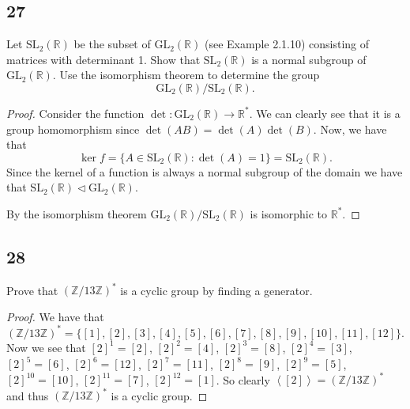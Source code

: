 \documentclass{article}
\newcommand{\Z}{\mathbb{Z}}
\newcommand{\R}{\mathbb{R}}
\newcommand{\gen}[1]{\left\langle #1 \right\rangle}
\newenvironment{hwproof}[1]
{
    #1
    \begin{proof}
}{
    \end{proof}
}
\begin{document}
\subsection*{27}
\begin{hwproof}
    {
        Let $\text{SL}_2(\R)$ be the subset of $\text{GL}_2(\R)$ (see Example 2.1.10)
        consisting of matrices with determinant 1. Show that $\text{SL}_2(\R)$ is a
        normal subgroup of $\text{GL}_2(\R)$. Use the isomorphism theorem to determine
        the group
        \begin{equation*}
            \text{GL}_2(\R) / \text{SL}_2(\R).
        \end{equation*}
    }

    Consider the function $\det: \text{GL}_2(\R) \to \R^*$. We can clearly see that it is a
    group homomorphism since $\det(AB) = \det(A)\det(B)$. Now, we have that
    \begin{equation*}
        \ker f = \{A \in \text{SL}_2(\R) : \det(A) = 1\} = \text{SL}_2(\R).
    \end{equation*}
    Since the kernel of a function is always a normal subgroup of the domain we
    have that $\text{SL}_2(\R) \triangleleft \text{GL}_2(\R)$.

    By the isomorphism theorem $\text{GL}_2(\R) / \text{SL}_2(\R)$ is isomorphic to
    $\R^*$.
\end{hwproof}

\subsection*{28}
\begin{hwproof}
    {
        Prove that $(\Z / 13\Z)^*$ is a cyclic group by finding a generator.
    }

    We have that
    \begin{equation*}
        (\Z / 13\Z)^* = \{[1],[2],[3],[4],[5],[6],[7],[8],[9],[10],[11],[12]\}.
    \end{equation*}
    Now we see that $[2]^1 = [2]$, $[2]^2 = [4]$, $[2]^3 = [8]$, $[2]^4 = [3]$,
    $[2]^5 = [6]$, $[2]^6 = [12]$, $[2]^7 = [11]$, $[2]^8 = [9]$,
    $[2]^9 = [5]$, $[2]^{10} = [10]$, $[2]^{11} = [7]$, $[2]^{12} = [1]$.
    So clearly $\gen{[2]} = (\Z / 13\Z)^*$ and thus $(\Z / 13\Z)^*$ is a cyclic
    group.
\end{hwproof}
\end{document}
